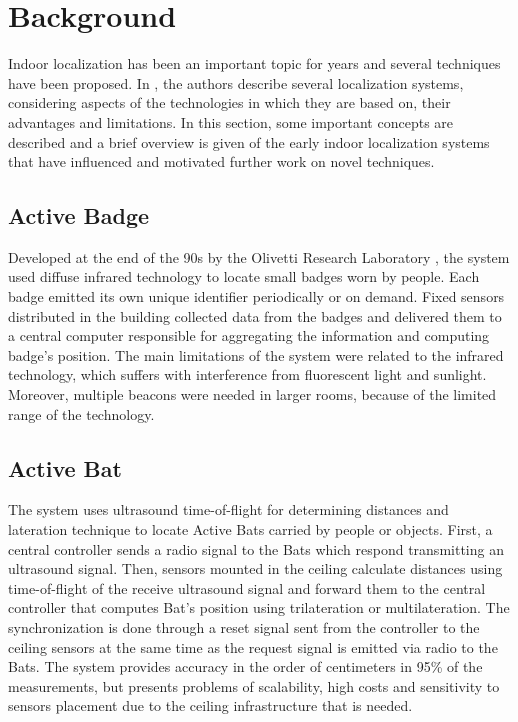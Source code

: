\section{Background}

Indoor localization has been an important topic for years and several techniques have been proposed. In \cite{locSysUbiComp}, the authors describe several localization systems, considering aspects of the technologies in which they are based on, their advantages and limitations. In this section, some important concepts are described and a brief overview is given of the early indoor localization systems that have influenced and motivated further work on novel techniques.

\subsection{Active Badge}
Developed at the end of the 90s by the Olivetti Research Laboratory \cite{activeBadge}, the system used diffuse infrared technology to locate small badges worn by people. Each badge emitted its own unique identifier periodically or on demand. Fixed sensors distributed in the building collected data from the badges and delivered them to a central computer responsible for aggregating the information and computing badge's position. The main limitations of the system were related to the infrared technology, which suffers with interference from fluorescent light and sunlight. Moreover, multiple beacons were needed in larger rooms, because of the limited range of the technology.

\subsection{Active Bat}
The system uses ultrasound time-of-flight for determining distances and lateration technique to locate Active Bats carried by people or objects. First, a central controller sends a radio signal to the Bats which respond transmitting an ultrasound signal. Then, sensors mounted in the ceiling calculate distances using time-of-flight of the receive ultrasound signal and forward them to the central controller that computes Bat's position using trilateration or multilateration. The synchronization is done through a reset signal sent from the controller to the ceiling sensors at the same time as the request signal is emitted via radio to the Bats. The system provides accuracy in the order of centimeters in 95\% of the measurements, but presents problems of scalability, high costs and sensitivity to sensors placement due to the ceiling infrastructure that is needed.

